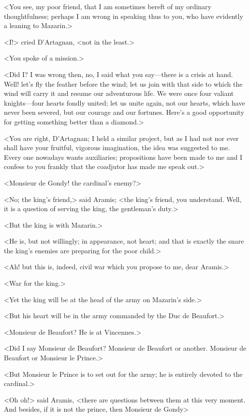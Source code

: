 <You see, my poor friend, that I am sometimes bereft of my ordinary thoughtfulness; perhaps I am wrong in speaking thus to you, who have evidently a leaning to Mazarin.>

<I\@!> cried D'Artagnan, <not in the least.>

<You spoke of a mission.>

<Did I\@? I was wrong then, no, I said what you say—there is a crisis at hand. Well! let's fly the feather before the wind; let us join with that side to which the wind will carry it and resume our adventurous life. We were once four valiant knights—four hearts fondly united; let us unite again, not our hearts, which have never been severed, but our courage and our fortunes. Here's a good opportunity for getting something better than a diamond.>

<You are right, D'Artagnan; I held a similar project, but as I had not nor ever shall have your fruitful, vigorous imagination, the idea was suggested to me. Every one nowadays wants auxiliaries; propositions have been made to me and I confess to you frankly that the coadjutor has made me speak out.>

<Monsieur de Gondy! the cardinal's enemy?>

<No; the king's friend,> said Aramis; <the king's friend, you understand. Well, it is a question of serving the king, the gentleman's duty.>

<But the king is with Mazarin.>

<He is, but not willingly; in appearance, not heart; and that is exactly the snare the king's enemies are preparing for the poor child.>

<Ah! but this is, indeed, civil war which you propose to me, dear Aramis.>

<War for the king.>

<Yet the king will be at the head of the army on Mazarin's side.>

<But his heart will be in the army commanded by the Duc de Beaufort.>

<Monsieur de Beaufort? He is at Vincennes.>

<Did I say Monsieur de Beaufort? Monsieur de Beaufort or another. Monsieur de Beaufort or Monsieur le Prince.>

<But Monsieur le Prince is to set out for the army; he is entirely devoted to the cardinal.>

<Oh oh!> said Aramis, <there are questions between them at this very moment. And besides, if it is not the prince, then Monsieur de Gondy\longdash>

